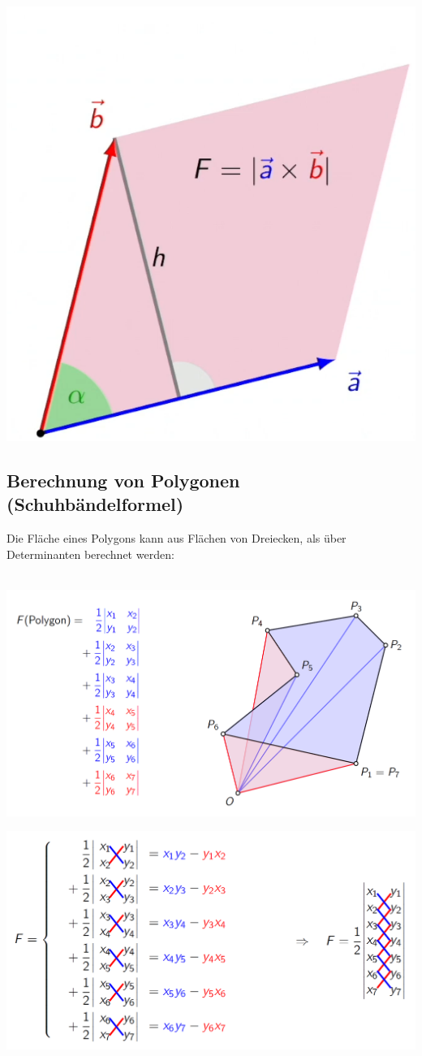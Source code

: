 		    \includegraphics[width= 0.3\linewidth]{Bilder/Zwischenwinkel}

		    
		    \subsection{Berechnung von Polygonen (Schuhbändelformel)}
		    Die Fläche eines Polygons kann aus Flächen von Dreiecken, als über Determinanten berechnet werden: \\
		    \\
		    \begin{minipage}{0.48\linewidth}
		    \includegraphics[width=\linewidth]{Bilder/flaeche-polygon} \\
		    \end{minipage}
		    \hfill
		    \begin{minipage}{0.48\linewidth}
		    \includegraphics[width=\linewidth]{Bilder/schuhbaendel}
		    \end{minipage}

